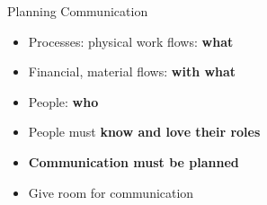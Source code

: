     
    
    
    
    
    
    
    




\begin{frame}{Planning Communication}
    \begin{itemize}
        \item Processes: physical work flows: \textbf{what}
        \item Financial, material flows: \textbf{with what}
        \item People: \textbf{who}
        \item People must \textbf{know and love their roles}
        \item \textbf{Communication must be planned}
        \item Give room for communication
    \end{itemize}
\end{frame}



